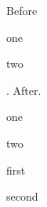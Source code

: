 Before\begin{enumerate*}[itemjoin={{; }}]\item one\item two\end{enumerate*}. After.

\begin{itemize*}\item one\item two\end{itemize*}

\begin{description*}\item[One] first\item[Two] second\end{description*}
